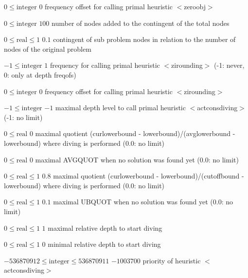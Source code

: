 %
{$0\leq\textrm{integer}$}%
{$0$}%
{frequency offset for calling primal heuristic $<$zeroobj$>$}%
{}

%
{$0\leq\textrm{integer}$}%
{$100$}%
{number of nodes added to the contingent of the total nodes}%
{}

%
{$0\leq\textrm{real}\leq1$}%
{$0.1$}%
{contingent of sub problem nodes in relation to the number of nodes of the original problem}%
{}

%
{$-1\leq\textrm{integer}$}%
{$1$}%
{frequency for calling primal heuristic $<$zirounding$>$ (-1: never, 0: only at depth freqofs)}%
{}

%
{$0\leq\textrm{integer}$}%
{$0$}%
{frequency offset for calling primal heuristic $<$zirounding$>$}%
{}

%
{$-1\leq\textrm{integer}$}%
{$-1$}%
{maximal depth level to call primal heuristic $<$actconsdiving$>$ (-1: no limit)}%
{}

%
{$0\leq\textrm{real}$}%
{$0$}%
{maximal quotient (curlowerbound - lowerbound)/(avglowerbound - lowerbound) where diving is performed (0.0: no limit)}%
{}

%
{$0\leq\textrm{real}$}%
{$0$}%
{maximal AVGQUOT when no solution was found yet (0.0: no limit)}%
{}

%
{$0\leq\textrm{real}\leq1$}%
{$0.8$}%
{maximal quotient (curlowerbound - lowerbound)/(cutoffbound - lowerbound) where diving is performed (0.0: no limit)}%
{}

%
{$0\leq\textrm{real}\leq1$}%
{$0.1$}%
{maximal UBQUOT when no solution was found yet (0.0: no limit)}%
{}

%
{$0\leq\textrm{real}\leq1$}%
{$1$}%
{maximal relative depth to start diving}%
{}

%
{$0\leq\textrm{real}\leq1$}%
{$0$}%
{minimal relative depth to start diving}%
{}

%
{$-536870912\leq\textrm{integer}\leq536870911$}%
{$-1003700$}%
{priority of heuristic $<$actconsdiving$>$}%
{}

